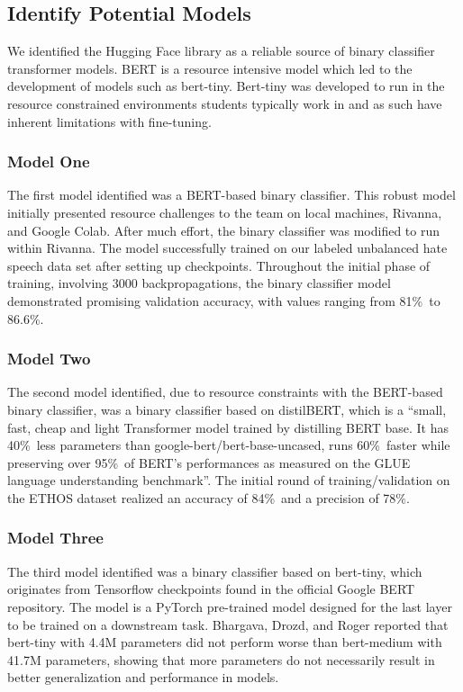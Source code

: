 \documentclass[conference]{IEEEtran}
\begin{document}
\subsection{Identify Potential Models}
We identified the Hugging Face library\cite{b19} as a reliable source of binary classifier transformer models. BERT is a resource intensive model which led to the development of models such as bert-tiny. Bert-tiny was developed to run in the resource constrained environments students typically work in and as such have inherent limitations with fine-tuning\cite{b20}. 

\subsubsection{Model One} The first model identified was a BERT-based binary classifier. This robust model\cite{b21} initially presented resource challenges to the team on local machines, Rivanna, and Google Colab. After much effort, the binary classifier was modified to run within Rivanna. The model successfully trained on our labeled unbalanced hate speech data set after setting up checkpoints\cite{b22}. Throughout the initial phase of training, involving 3000 backpropagations, the binary classifier model demonstrated promising validation accuracy, with values ranging from 81\%\ to 86.6\%.

\subsubsection{Model Two}The second model identified, due to resource constraints with the BERT-based binary classifier, was a binary classifier based on distilBERT, which is a “small, fast, cheap and light Transformer model trained by distilling BERT base. It has 40\%\ less parameters than google-bert/bert-base-uncased, runs 60\%\ faster while preserving over 95\%\ of BERT’s performances as measured on the GLUE language understanding benchmark”\cite{b23}. The initial round of training/validation on the ETHOS dataset realized an accuracy of 84\%\ and a precision of 78\%\cite{b24}.

\subsubsection{Model Three}The third model identified was a binary classifier based on bert-tiny\cite{b20}, which originates from Tensorflow checkpoints found in the official Google BERT repository. The model is a PyTorch pre-trained model designed for the last layer to be trained on a downstream task\cite{b25}. Bhargava, Drozd, and Roger\cite{b25} reported that bert-tiny with 4.4M parameters did not perform worse than bert-medium with 41.7M parameters, showing that more parameters do not necessarily result in better generalization and performance in models. 
\end{document}
